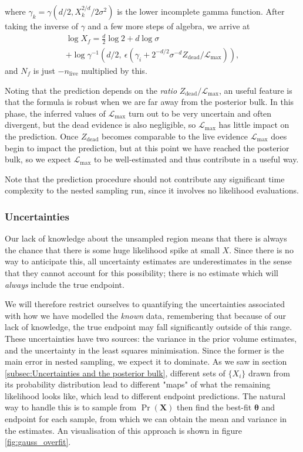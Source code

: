 \documentclass[usenatbib]{mnras}
\newcommand{\thetab}{\bm{\theta}}
\newcommand{\set}[1]{\{#1\}}
\newcommand{\nlive}{n_\mathrm{live}}
\newcommand{\Like}{\mathcal{L}}
\begin{document}
where $\gamma_k = \gamma\left(d/2, X_k^{2/d}/2\sigma^2\right)$ is the lower incomplete gamma function. After taking the inverse of  $\gamma$ and a few more steps of algebra, we arrive at
\begin{multline}
	\log X_f = \frac{d}{2}\log 2 + d \log \sigma \\
	+ \log \gamma^{-1} \left( d/2 ,\ \epsilon \left(\gamma_i+ 2^{-d/2} \sigma^{-d} Z_\mathrm{dead}/\Like_\mathrm{max}\right)\right),
\end{multline}
and $N_f$ is just  $-\nlive$ multiplied by this. 
\par
Noting that the prediction depends on the \textit{ratio} $Z_\mathrm{dead}/\Like_\mathrm{max}$, an useful feature is that the formula is robust when we are far away from the posterior bulk. In this phase, the inferred values of $\Like_\mathrm{max}$ turn out to be very uncertain and often divergent, but the dead evidence is also negligible, so $\Like_\mathrm{max}$ has little impact on the prediction. Once $Z_\mathrm{dead}$ becomes comparable to the live evidence $\Like_\mathrm{max}$ does begin to impact the prediction, but at this point we have reached the posterior bulk, so we expect $\Like_\mathrm{max}$ to be well-estimated and thus contribute in a useful way.
\par
Note that the prediction procedure should not contribute any significant time complexity to the nested sampling run, since it involves no likelihood evaluations. 

\subsubsection{Uncertainties}
Our lack of knowledge about the unsampled region means that there is always the chance that there is some huge likelihood spike at small $X$. Since there is no way to anticipate this, all uncertainty estimates are underestimates in the sense that they cannot account for this possibility; there is no estimate which will \textit{always} include the true endpoint. 
\par
We will therefore restrict ourselves to quantifying the uncertainties associated with how we have modelled the \textit{known} data, remembering that because of our lack of knowledge, the true endpoint may fall significantly outside of this range. These uncertainties have two sources: the variance in the prior volume estimates, and the uncertainty in the least squares minimisation. Since the former is the main error in nested sampling, we expect it to dominate. As we saw in section \ref{subsec:Uncertainties and the posterior bulk}, different sets of $\set{X_i}$ drawn from its probability distribution lead to different "maps" of what the remaining likelihood looks like, which lead to different endpoint predictions. The natural way to handle this is to sample from $\Pr(\bm{X})$ then find the best-fit  $\thetab$ and endpoint for each sample, from which we can obtain the mean and variance in the estimates. An visualisation of this approach is shown in figure \ref{fig:gauss_overfit}.
\end{document}
